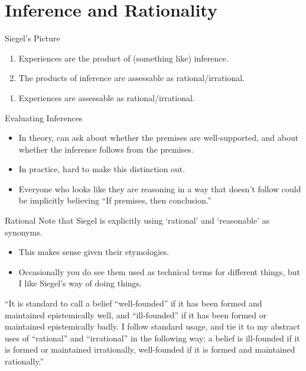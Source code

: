 \documentclass[
  17pt,
  letterpaper,
  ignorenonframetext,
  aspectratio=169,
  xcolor={dvipsnames}]{beamer}
\providecommand{\tightlist}{%
  \setlength{\itemsep}{0pt}\setlength{\parskip}{0pt}}\usepackage{longtable,booktabs,array}
\begin{document}
\hypertarget{inference-and-rationality}{%
\section{Inference and Rationality}\label{inference-and-rationality}}

\begin{frame}{Siegel's Picture}
\protect\hypertarget{siegels-picture}{}
\begin{enumerate}[<+->]
\tightlist
\item
  Experiences are the product of (something like) inference.
\item
  The products of inference are assessable as rational/irrational.
\end{enumerate}

\begin{enumerate}[<+->]
[A.]
\setcounter{enumi}{2}
\tightlist
\item
  Experiences are assessable as rational/irrational.
\end{enumerate}
\end{frame}

\begin{frame}{Evaluating Inferences}
\protect\hypertarget{evaluating-inferences}{}
\begin{itemize}[<+->]
\tightlist
\item
  In theory, can ask about whether the premises are well-supported, and
  about whether the inference follows from the premises.
\item
  In practice, hard to make this distinction out.
\item
  Everyone who looks like they are reasoning in a way that doesn't
  follow could be implicitly believing ``If premises, then conclusion.''
\end{itemize}
\end{frame}

\begin{frame}{Rational}
\protect\hypertarget{rational}{}
Note that Siegel is explicitly using `rational' and `reasonable' as
synonyms.

\begin{itemize}[<+->]
\tightlist
\item
  This makes sense given their etymologies.
\item
  Occasionally you do see them used as technical terms for different
  things, but I like Siegel's way of doing things.
\end{itemize}

\end{frame} \begin{frame}[plain]

``It is standard to call a belief ``well-founded'' if it has been formed
and maintained epistemically well, and ``ill-founded'' if it has been
formed or maintained epistemically badly. I follow standard usage, and
tie it to my abstract uses of ``rational'' and ``irrational'' in the
following way: a belief is ill-founded if it is formed or maintained
irrationally, well-founded if it is formed and maintained rationally.''
\end{frame}
\end{document}
